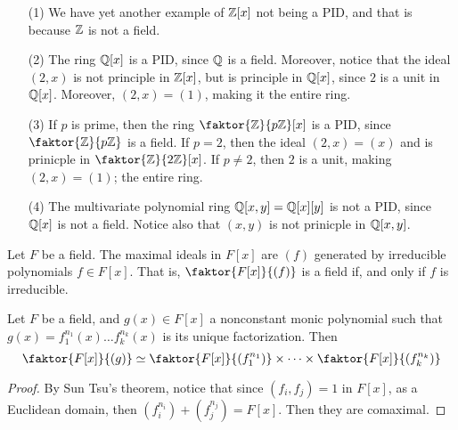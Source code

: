 \begin{example}\label{example_3.7}
    \begin{enumerate}
        \item[(1)] We have yet another example of $\mathbb{Z}[x]$ not being a PID, and
            that is because $\mathbb{Z}$ is not a field.

        \item[(2)] The ring $\mathbb{Q}[x]$ is a PID, since $\mathbb{Q}$ is a field. Moreover,
            notice that the ideal  $(2,x)$ is not principle in $\mathbb{Z}[x]$, but is
            principle in $\mathbb{Q}[x]$, since $2$ is a unit in  $\mathbb{Q}[x]$. Moreover,
            $(2,x)=(1)$, making it the entire ring.

        \item[(3)] If $p$ is prime, then the ring  $\faktor{\Z}{p\Z}[x]$ is a
            PID, since $\faktor{\Z}{p\Z}$ is a field. If $p=2$, then the ideal
            $(2,x)=(x)$ and is prinicple in $\faktor{\Z}{2\Z}[x]$. If $p \neq 2$,
            then  $2$ is a unit, making  $(2,x)=(1)$; the entire ring.

        \item[(4)] The multivariate polynomial ring $\mathbb{Q}[x,y]=\mathbb{Q}[x][y]$ is not a
            PID, since $\mathbb{Q}[x]$ is not a field. Notice also that $(x,y)$ is not
            prinicple in $\mathbb{Q}[x,y]$.
    \end{enumerate}
\end{example}

\begin{lemma}\label{3.4.2}
    Let $F$ be a field. The maximal ideals in  $F[x]$ are $(f)$ generated by
    irreducible polynomials $f \in F[x]$. That is, $\faktor{F[x]}{(f)}$ is a
    field if, and only if $f$ is irreducible.
\end{lemma}

\begin{lemma}\label{4.3.4}
    Let $F$ be a field, and  $g(x) \in F[x]$ a nonconstant monic polynomial such
    that $g(x)=f_1^{n_1}(x) \dots f_k^{n_k}(x)$ is its unique factorization.
    Then
    \begin{equation*}
        \faktor{F[x]}{(g)} \simeq \faktor{F[x]}{(f_1^{n_1})} \times
        \dots \times \faktor{F[x]}{(f_k^{n_k})}
    \end{equation*}
\end{lemma}
\begin{proof}
    By Sun Tsu's theorem, notice that since $(f_i,f_j)=1$ in $F[x]$, as a
    Euclidean domain, then $(f_i^{n_i})+(f_j^{n_j})=F[x]$. Then they are
    comaximal.
\end{proof}

